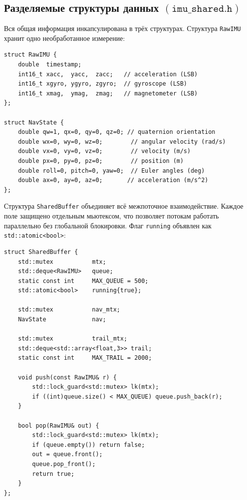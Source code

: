 \documentclass[../main.tex]{subfiles}
\begin{document}
\subsection{Разделяемые структуры данных $(\texttt{imu\_shared.h})$}

Вся общая информация инкапсулирована в трёх структурах. Структура
\texttt{RawIMU} хранит одно необработанное измерение:
 
\begin{lstlisting}[caption={Структуры RawIMU и NavState}]
struct RawIMU {
    double  timestamp;
    int16_t xacc,  yacc,  zacc;   // acceleration (LSB)
    int16_t xgyro, ygyro, zgyro;  // gyroscope (LSB)
    int16_t xmag,  ymag,  zmag;   // magnetometer (LSB)
};

struct NavState {
    double qw=1, qx=0, qy=0, qz=0; // quaternion orientation
    double wx=0, wy=0, wz=0;        // angular velocity (rad/s)
    double vx=0, vy=0, vz=0;        // velocity (m/s)
    double px=0, py=0, pz=0;        // position (m)
    double roll=0, pitch=0, yaw=0;  // Euler angles (deg)
    double ax=0, ay=0, az=0;       // acceleration (m/s^2)
};
\end{lstlisting}
 
Структура \texttt{SharedBuffer} объединяет всё межпоточное взаимодействие.
Каждое поле защищено отдельным мьютексом, что позволяет потокам работать
параллельно без глобальной блокировки. Флаг \texttt{running} объявлен
как \texttt{std::atomic<bool>}:
 
\begin{lstlisting}[caption={Потокобезопасный разделяемый буфер}]
struct SharedBuffer {
    std::mutex           mtx;
    std::deque<RawIMU>   queue;
    static const int     MAX_QUEUE = 500;
    std::atomic<bool>    running{true};

    std::mutex           nav_mtx;
    NavState             nav;

    std::mutex           trail_mtx;
    std::deque<std::array<float,3>> trail;
    static const int     MAX_TRAIL = 2000;

    void push(const RawIMU& r) {
        std::lock_guard<std::mutex> lk(mtx);
        if ((int)queue.size() < MAX_QUEUE) queue.push_back(r);
    }

    bool pop(RawIMU& out) {
        std::lock_guard<std::mutex> lk(mtx);
        if (queue.empty()) return false;
        out = queue.front();
        queue.pop_front();
        return true;
    }
};
\end{lstlisting}

	
\end{document}
